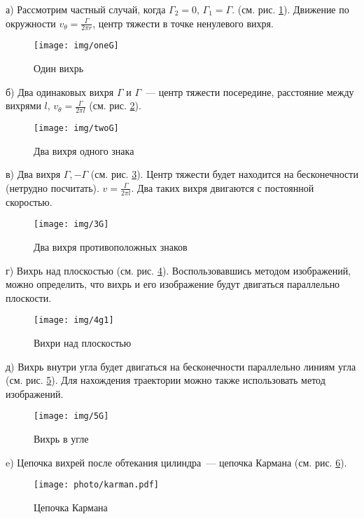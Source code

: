а) Рассмотрим частный случай, когда $\Gamma_2=0$, $\Gamma_1=\Gamma$. (см. рис. \ref{fig:oneG}). Движение по окружности $v_\theta=\frac{\Gamma}{2\pi r}$, центр тяжести в точке ненулевого вихря.

\begin{figure}[H]
    \centering
    \texttt{[image: img/oneG]}
    \caption{Один вихрь}
    \label{fig:oneG}
\end{figure}

б) Два одинаковых вихря $\Gamma$ и $\Gamma$~--- центр тяжести посередине, расстояние между вихрями $l$, $v_\theta=\frac{\Gamma}{2\pi l}$  (см. рис. \ref{fig:twoG}).

\begin{figure}[H]
    \centering
    \texttt{[image: img/twoG]}
    \caption{Два вихря одного знака}
    \label{fig:twoG}
\end{figure}

в) Два вихря $\Gamma, -\Gamma$  (см. рис. \ref{fig:3G}). Центр тяжести будет находится на бесконечности (нетрудно посчитать). $v=\frac{\Gamma}{2\pi l}$. Два таких вихря двигаются с постоянной скоростью.

\begin{figure}[H]
    \centering
    \texttt{[image: img/3G]}
    \caption{Два вихря противоположных знаков}
    \label{fig:3G}
\end{figure}

г) Вихрь над плоскостью  (см. рис. \ref{fig:4g1}). Воспользовавшись методом изображений, можно определить, что вихрь и его изображение будут двигаться параллельно плоскости.

\begin{figure}[H]
    \centering
    \texttt{[image: img/4g1]}
    \caption{Вихри над плоскостью}
    \label{fig:4g1}
\end{figure}

д) Вихрь внутри угла будет двигаться на бесконечности параллельно линиям угла (см. рис. \ref{fig:5G}). Для нахождения траектории можно также использовать метод изображений.

\begin{figure}[H]
    \centering
    \texttt{[image: img/5G]}
    \caption{Вихрь в угле}
    \label{fig:5G}
\end{figure}
\newpage
e) Цепочка вихрей после обтекания цилиндра~--- цепочка Кармана (см. рис. \ref{fig:karman_chain}).
\begin{figure}[H]
	\centering
	\texttt{[image: photo/karman.pdf]}
	\caption{Цепочка Кармана}
	\label{fig:karman_chain}
\end{figure}


